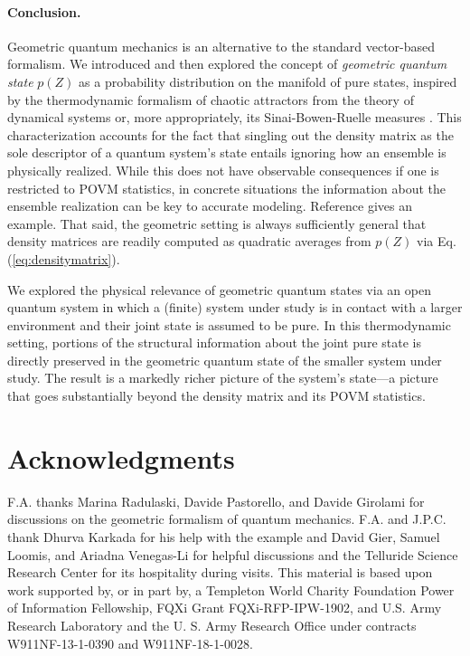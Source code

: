 \documentclass[draft,nofootinbib,pre,twocolumn,showpacs,showkeys,preprintnumbers,floatfix]{revtex4-1}
\newcommand{\1}{\mathbbm{1}}
\begin{document}
\paragraph*{Conclusion.}
Geometric quantum mechanics is an alternative to the standard vector-based
formalism. We introduced and then explored the concept of \emph{geometric
quantum state} $p(Z)$ as a probability distribution on the manifold of pure
states, inspired by the thermodynamic formalism of chaotic attractors from the
theory of dynamical systems or, more appropriately, its Sinai-Bowen-Ruelle
measures \cite{Eckmann1985}. This characterization accounts for the fact 
that singling out the density matrix as the sole descriptor of a quantum 
system's state entails ignoring how an ensemble is physically realized.
While this does not have observable consequences if one is restricted to POVM
statistics, in concrete situations the information about the ensemble
realization can be key to accurate modeling. Reference \cite{Anza20c} gives an
example. That said, the geometric setting is always sufficiently general
that density matrices are readily computed as quadratic averages from $p(Z)$
via Eq. (\ref{eq:densitymatrix}).

We explored the physical relevance of geometric quantum states via an open
quantum system in which a (finite) system under study is in contact with a
larger environment and their joint state is assumed to be pure. In this
thermodynamic setting, portions of the structural information about the joint
pure state is directly preserved in the geometric quantum state of the smaller
system under study. The result is a markedly richer picture of the system's
state---a picture that goes substantially beyond the density matrix and its
POVM statistics.

\section*{Acknowledgments}
\label{sec:acknowledgments}

F.A. thanks Marina Radulaski, Davide Pastorello, and Davide Girolami for
discussions on the geometric formalism of quantum mechanics. F.A. and J.P.C.
thank Dhurva Karkada for his help with the example and David Gier, Samuel
Loomis, and Ariadna Venegas-Li for helpful discussions and the Telluride
Science Research Center for its hospitality during visits.  This material is
based upon work supported by, or in part by, a Templeton World Charity
Foundation Power of Information Fellowship, FQXi Grant FQXi-RFP-IPW-1902, and
U.S. Army Research Laboratory and the U. S. Army Research Office under
contracts W911NF-13-1-0390 and W911NF-18-1-0028.
\end{document}

